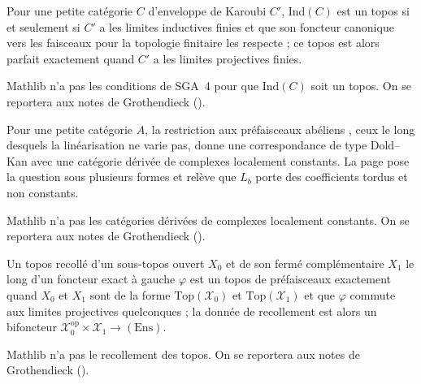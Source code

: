 \begin{encadre}
\begin{conjecture*}
Pour une petite catégorie $C$ d'enveloppe de Karoubi $C'$, $\mathrm{Ind}(C)$ est un topos si et seulement si $C'$ a les limites inductives finies et que son foncteur canonique vers les faisceaux pour la topologie finitaire les respecte ; ce topos est alors parfait exactement quand $C'$ a les limites projectives finies.
\end{conjecture*}
\end{encadre}
{\small Mathlib n'a pas les conditions de SGA~4 pour que $\mathrm{Ind}(C)$ soit un topos. On se reportera aux notes de Grothendieck ().\par}

\begin{encadre}
\begin{conjecture*}
Pour une petite catégorie $A$, la restriction aux préfaisceaux abéliens , ceux le long desquels la linéarisation ne varie pas, donne une correspondance de type Dold--Kan avec une catégorie dérivée de complexes localement constants. La page pose la question sous plusieurs formes et relève que $L_b$ porte des coefficients tordus et non constants.
\end{conjecture*}
\end{encadre}
{\small Mathlib n'a pas les catégories dérivées de complexes localement constants. On se reportera aux notes de Grothendieck ().\par}

\begin{encadre}
\begin{conjecture*}
Un topos recollé d'un sous-topos ouvert $X_0$ et de son fermé complémentaire $X_1$ le long d'un foncteur exact à gauche $\varphi$ est un topos de préfaisceaux exactement quand $X_0$ et $X_1$ sont de la forme $\mathrm{Top}(\mathcal X_0)$ et $\mathrm{Top}(\mathcal X_1)$ et que $\varphi$ commute aux limites projectives quelconques ; la donnée de recollement est alors un bifoncteur $\mathcal X_0^{\mathrm{op}} \times \mathcal X_1 \to (\mathrm{Ens})$.
\end{conjecture*}
\end{encadre}
{\small Mathlib n'a pas le recollement des topos. On se reportera aux notes de Grothendieck ().\par}
